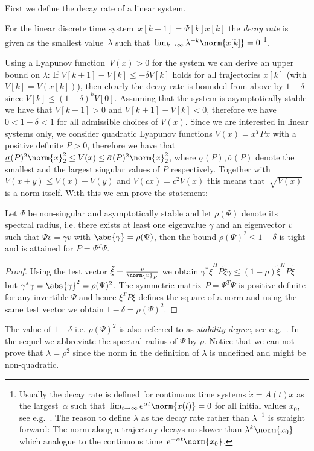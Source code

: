 \\[1em]
First we define the decay rate of a linear system.
%
\begin{defi}
For the linear discrete time system~$x[k+1] = \Psi[k] x[k]$ the \emph{decay rate} is given as the smallest value~$\lambda$ 
such that~$\lim_{k\rightarrow\infty}\lambda^{-k}\norm{x[k]}=0$
%
\footnote{Usually the decay rate is defined for continuous time systems $\dot x = A(t)x$ as the largest~$\alpha$ 
such that~$\lim_{t\rightarrow\infty}e^{\alpha t}\norm{x(t)}=0$ for all initial values $x_0$, see e.g.~\cite{Luenberger:1979}.
%
The reason to define $\lambda$ as the decay rate rather than $\lambda^{-1}$ is straight forward: 
%
The norm along a trajectory decays no slower than $\lambda^k\norm{x_0}$ which analogue to the continuous 
time~$e^{-\alpha t}\norm{x_0}$.}.
\end{defi}
%
Using a Lyapunov function~$V(x)>0$ for the system we can derive an upper bound on $\lambda$:
%
If $V[k+1]-V[k]\leq-\delta V[k]$ holds for all trajectories $x[k]$ (with $V[k] = V(x[k])$), then clearly the 
decay rate is bounded from above by $1-\delta$ since $V[k]\leq(1-\delta)^k V[0]$.
%
Assuming that the system is asymptotically stable we have that $V[k+1]>0$ and $V[k+1]-V[k]<0$, therefore we have~$0<1-\delta<1$
for all admissible choices of $V(x)$.
%
Since we are interested in linear systems only, we consider quadratic Lyapunov functions $V(x) = x^TPx$ with a positive
definite $P>0$, therefore we have that $\underline\sigma(P)^2\norm{x}_2^2\leq V(x)\leq \bar\sigma(P)^2\norm{x}_2^2$, 
where $\underline\sigma(P),\bar\sigma(P)$ denote the smallest and the largest singular values of $P$ respectively.
%
Together with $V(x+y)\leq V(x)+V(y)$ and $V(cx)=c^2 V(x)$ this means that~$\sqrt{V(x)}$ is a norm itself.
%
With this we can prove the statement:
%
\begin{thm}
Let $\Psi$ be non-singular and asymptotically stable and let $\rho(\Psi)$ denote its spectral radius, i.e. 
there exists at least one eigenvalue $\gamma$ and an eigenvector $v$ such that $\Psi v = \gamma v$ 
with $\abs{\gamma}=\rho(\Psi)$, then the bound $\rho(\Psi)^2\leq1-\delta$ is tight and is attained 
for $P=\Psi^T\Psi$.
\end{thm}
%
\begin{proof}
Using the test vector $\tilde\xi=\frac{v}{\norm{v}_P}$ we obtain $\gamma^\ast\tilde\xi^H P\tilde \xi\gamma
\leq(1-\rho)\tilde\xi^H P\tilde\xi$ but $\gamma^\ast\gamma = \abs{\gamma}^2 = \rho(\Psi)^2$.
%
The symmetric matrix $P = \Psi^T\Psi$ is positive definite for any invertible $\Psi$ and hence $\xi^T P\xi$ 
defines the square of a norm and using the same test vector we obtain $1-\delta=\rho(\Psi)^2$.
%
\end{proof}
%
The value of $1-\delta$ i.e. $\rho(\Psi)^2$ is also referred to as \emph{stability degree}, see e.g.~\cite{Boyd:94}.
%
In the sequel we abbreviate the spectral radius of $\Psi$ by $\rho$.
%
Notice that we can not prove that $\lambda=\rho^2$ since the norm in the definition of $\lambda$ is 
undefined and might be non-quadratic.

